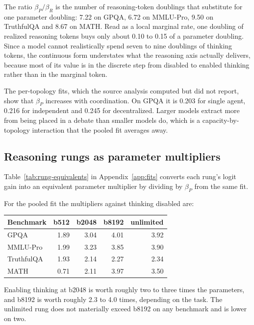 The ratio $\beta_P/\beta_R$ is the number of reasoning-token doublings that substitute for
one parameter doubling: 7.22 on GPQA, 6.72 on MMLU-Pro, 9.50 on TruthfulQA and 8.67 on
MATH. Read as a local marginal rate, one doubling of realized reasoning tokens buys only
about 0.10 to 0.15 of a parameter doubling. Since a model cannot realistically spend seven
to nine doublings of thinking tokens, the continuous form understates what the reasoning
axis actually delivers, because most of its value is in the discrete step from disabled to
enabled thinking rather than in the marginal token.

The per-topology fits, which the source analysis computed but did not report, show that
$\beta_P$ increases with coordination. On GPQA it is 0.203 for single agent, 0.216 for
independent and 0.245 for decentralized. Larger models extract more from being placed in a
debate than smaller models do, which is a capacity-by-topology interaction that the pooled
fit averages away.

\subsection{Reasoning rungs as parameter multipliers}

Table~\ref{tab:rung-equivalents} in Appendix~\ref{app:fits} converts each rung's logit
gain into an equivalent parameter multiplier by dividing by $\beta_P$ from the same fit.

For the pooled fit the multipliers against thinking disabled are:

\begin{center}
\small
\begin{tabular}{lrrrr}
\toprule
Benchmark & b512 & b2048 & b8192 & unlimited \\
\midrule
GPQA & 1.89 & 3.04 & 4.01 & 3.92 \\
MMLU-Pro & 1.99 & 3.23 & 3.85 & 3.90 \\
TruthfulQA & 1.93 & 2.14 & 2.27 & 2.34 \\
MATH & 0.71 & 2.11 & 3.97 & 3.50 \\
\bottomrule
\end{tabular}
\end{center}

Enabling thinking at b2048 is worth roughly two to three times the parameters, and b8192 is
worth roughly 2.3 to 4.0 times, depending on the task. The unlimited rung does not
materially exceed b8192 on any benchmark and is lower on two.

